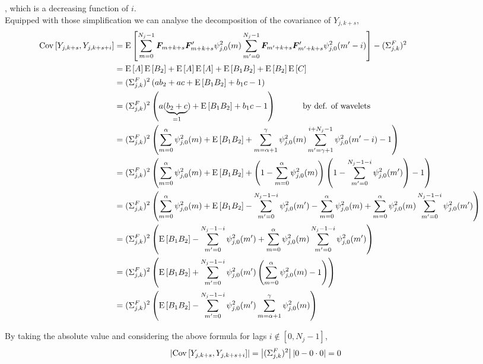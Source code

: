 \documentclass[main_document.tex]{subfiles}
\begin{document}
, which is a decreasing function of $i$. \\
Equipped with those simplification we can analyse the decomposition of the covariance of $Y_{j,k+s}$, 
\begin{align*}
	\Cov{Y_{j,k+s}}{Y_{j,k+s+i}} &= \E{\sum_{m=0}^{N_j-1} \factors{m+k+s}\factors{m+k+s}' \squaredWavelet{j}{0}{m}\sum_{m'=0}^{N_j-1} \factors{m'+k+s}\factors{m'+k+s}' \squaredWavelet{j}{0}{m'-i}} - (\Sigma_{j,k}^{F})^{2} \\
	&= \E{A} \E{B_2} + \E{A}\E{A} + \E{B_1 B_2} + \E{B_2} \E{C} \\
	&= (\Sigma_{j,k}^{F})^{2} \left ( ab_2 + ac + \E{B_1 B_2} + b_1 c - 1 \right) \\
	&= (\Sigma_{j,k}^{F})^{2} \left ( a (\underbrace{b_2 + c}_{=1}) + \E{B_1 B_2} + b_1 c - 1 \right) \hspace{1cm} \text{ by def. of wavelets } \\
	&= (\Sigma_{j,k}^{F})^{2} \left( \sum_{m=0}^{\alpha} \squaredWavelet{j}{0}{m} + \E{B_1 B_2} + \sum_{m=\alpha+1}^{\gamma} \squaredWavelet{j}{0}{m} \sum_{m'=\gamma+1}^{i+N_j-1} \squaredWavelet{j}{0}{m'-i} - 1\right) \\ 
	&= (\Sigma_{j,k}^{F})^{2} \left( \sum_{m=0}^{\alpha} \squaredWavelet{j}{0}{m} + \E{B_1 B_2} + \left( 1 - \sum_{m=0}^{\alpha} \squaredWavelet{j}{0}{m} \right) \left( 1 - \sum_{m'=0}^{N_j-1-i} \squaredWavelet{j}{0}{m'} \right) - 1 \right) \\
	&= (\Sigma_{j,k}^{F})^{2} \left( \sum_{m=0}^{\alpha} \squaredWavelet{j}{0}{m} + \E{B_1 B_2} - \sum_{m'=0}^{N_j-1-i} \squaredWavelet{j}{0}{m'} - \sum_{m=0}^{\alpha} \squaredWavelet{j}{0}{m} + \sum_{m=0}^{\alpha} \squaredWavelet{j}{0}{m} \sum_{m'=0}^{N_j-1-i} \squaredWavelet{j}{0}{m'} \right) \\
	&= (\Sigma_{j,k}^{F})^{2} \left(\E{B_1 B_2} - \sum_{m'=0}^{N_j-1-i} \squaredWavelet{j}{0}{m'} + \sum_{m=0}^{\alpha} \squaredWavelet{j}{0}{m} \sum_{m'=0}^{N_j-1-i} \squaredWavelet{j}{0}{m'} \right)\\
	&= (\Sigma_{j,k}^{F})^{2} \left(\E{B_1 B_2} + \sum_{m'=0}^{N_j-1-i} \squaredWavelet{j}{0}{m'} \left( \sum_{m=0}^{\alpha} \squaredWavelet{j}{0}{m} - 1 \right) \right) \\
	&= (\Sigma_{j,k}^{F})^{2} \left(\E{B_1 B_2} - \sum_{m'=0}^{N_j-1-i} \squaredWavelet{j}{0}{m'} \sum_{m=\alpha+1}^{\gamma} \squaredWavelet{j}{0}{m} \right)
\end{align*}

By taking the absolute value and considering the above formula for lags $i \notin [0,N_j-1]$, 
\begin{align*}
	\left \lvert \mathrm{Cov}\left[Y_{j,k+s},Y_{j,k+s+i}\right] \right \rvert &= \left \lvert  (\Sigma_{j,k}^{F})^{2} \right \rvert \left \lvert 0 - 0 \cdot 0 \right \rvert = 0
\end{align*}
\end{document}

